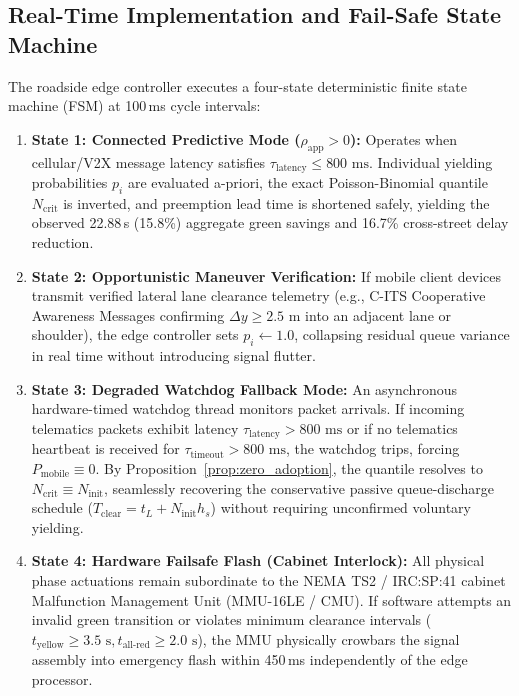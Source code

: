 \documentclass[journal,10pt,twocolumn]{IEEEtran}
\begin{document}
\subsection{Real-Time Implementation and Fail-Safe State Machine}
The roadside edge controller executes a four-state deterministic finite state machine (FSM) at 100\,ms cycle intervals:
\begin{enumerate}
    \item \textbf{State 1: Connected Predictive Mode ($\rho_{\text{app}} > 0$):} Operates when cellular/V2X message latency satisfies $\tau_{\text{latency}} \le 800\text{ ms}$. Individual yielding probabilities $p_i$ are evaluated a-priori, the exact Poisson-Binomial quantile $N_{\text{crit}}$ is inverted, and preemption lead time is shortened safely, yielding the observed 22.88\,s (15.8\%) aggregate green savings and 16.7\% cross-street delay reduction.
    \item \textbf{State 2: Opportunistic Maneuver Verification:} If mobile client devices transmit verified lateral lane clearance telemetry (e.g., C-ITS Cooperative Awareness Messages confirming $\Delta y \ge 2.5\text{ m}$ into an adjacent lane or shoulder), the edge controller sets $p_i \leftarrow 1.0$, collapsing residual queue variance in real time without introducing signal flutter.
    \item \textbf{State 3: Degraded Watchdog Fallback Mode:} An asynchronous hardware-timed watchdog thread monitors packet arrivals. If incoming telematics packets exhibit latency $\tau_{\text{latency}} > 800\text{ ms}$ or if no telematics heartbeat is received for $\tau_{\text{timeout}} > 800\text{ ms}$, the watchdog trips, forcing $P_{\text{mobile}} \equiv 0$. By Proposition~\ref{prop:zero_adoption}, the quantile resolves to $N_{\text{crit}} \equiv N_{\text{init}}$, seamlessly recovering the conservative passive queue-discharge schedule ($T_{\text{clear}} = t_L + N_{\text{init}} h_s$) without requiring unconfirmed voluntary yielding.
    \item \textbf{State 4: Hardware Failsafe Flash (Cabinet Interlock):} All physical phase actuations remain subordinate to the NEMA TS2 / IRC:SP:41 cabinet Malfunction Management Unit (MMU-16LE / CMU). If software attempts an invalid green transition or violates minimum clearance intervals ($t_{\text{yellow}} \ge 3.5\text{ s}, t_{\text{all-red}} \ge 2.0\text{ s}$), the MMU physically crowbars the signal assembly into emergency flash within 450\,ms independently of the edge processor.
\end{enumerate}
\end{document}
